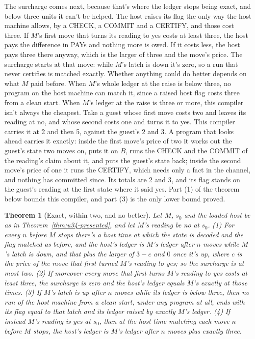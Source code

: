 \documentclass[11pt,twoside]{article}
\theoremstyle{thielethm}
\newtheorem{theorem}{Theorem}[section]
\theoremstyle{thieledef}
\theoremstyle{thieledef}
\theoremstyle{thieledef}
\theoremstyle{thielethm}
\theoremstyle{thieleobs}
\theoremstyle{thielethm}
\begin{document}
The surcharge comes next, because that's where the ledger stops being exact, and below three units it
can't be helped. The
host raises its flag the only way the host machine allows, by a CHECK, a COMMIT and a CERTIFY, and
those cost three. If $M$'s first move that turns its reading to yes costs at least three, the host
pays the difference in PAYs and nothing more is owed. If it costs less, the host pays three there
anyway, which is the larger of three and the move's price. The surcharge starts at that move:
while $M$'s latch is down it's zero, so a run that never certifies is matched exactly. Whether
anything could do better depends on what $M$ paid before. When $M$'s whole ledger at the raise is
below three, no program on the host machine can match it, since a raised host flag costs three
from a clean start. When $M$'s ledger at the raise is three or more, this compiler isn't always the cheapest. Take a
guest whose first move costs two and leaves its reading at no, and whose second costs one and turns
it to yes. This compiler carries it at 2 and then 5, against the guest's 2 and 3. A program that
looks ahead carries it exactly: inside the first move's price of two it works out the guest's state
two moves on, puts it on $B$, runs the CHECK and the COMMIT of the reading's claim about it, and
puts the guest's state back; inside the second move's price of one it runs the CERTIFY, which needs
only a fact in the channel, and nothing has committed since. Its totals are 2 and 3, and its flag
stands on the guest's reading at the first state where it said yes. Part (1) of the theorem below
bounds this compiler, and part (3) is the only lower bound proved.

\begin{theorem}[Exact, within two, and no better]\label{thm:u34-presented-surcharge}
Let $M$, $s_0$ and the loaded host be as in Theorem~\ref{thm:u34-presented}, and let $M$'s reading
be no at $s_0$. (1) For every $n$ before $M$ stops there's a host time at which the state is decoded and the flag matched as before, and the host's ledger is $M$'s ledger after $n$ moves while $M$'s latch is down, and that plus the larger of $3 - c$ and $0$ once it's up, where $c$ is the price of the move that first turned $M$'s reading to yes; so the surcharge is at most two. (2) If moreover every move that first turns $M$'s reading to yes costs at
least three, the surcharge is zero and the host's ledger equals $M$'s exactly at those times.
(3) If $M$'s latch is up after $n$ moves while its ledger is below three, then no run of the host
machine from a clean start, under any program at all, ends with its flag equal to that latch and
its ledger raised by exactly $M$'s ledger. (4) If instead $M$'s reading is yes at $s_0$, then at
the host time matching each move $n$ before $M$ stops, the host's ledger is $M$'s ledger after
$n$ moves plus exactly three.
\end{theorem}
\end{document}
